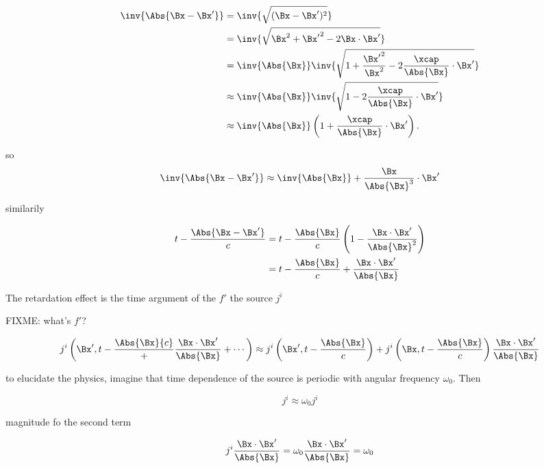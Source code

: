 \begin{align*}
\inv{\Abs{\Bx - \Bx'}}
&=
\inv{\sqrt{(\Bx - \Bx')^2}} \\
&=
\inv{\sqrt{\Bx^2 + {\Bx'}^2 - 2 \Bx \cdot \Bx'}} \\
&=
\inv{\Abs{\Bx}} \inv{\sqrt{1 + \frac{{\Bx'}^2}{\Bx^2} - 2 \frac{\xcap}{\Abs{\Bx}} \cdot \Bx'}} \\
&\approx
\inv{\Abs{\Bx}} \inv{\sqrt{1 - 2 \frac{\xcap}{\Abs{\Bx}} \cdot \Bx'}} \\
&\approx
\inv{\Abs{\Bx}} \left(1 + \frac{\xcap}{\Abs{\Bx}} \cdot \Bx' \right).
\end{align*}

so
\begin{equation}\label{eqn:relativisticElectrodynamicsL20:30}
\inv{\Abs{\Bx - \Bx'}}
\approx 
\inv{\Abs{\Bx}} + \frac{\Bx}{\Abs{\Bx}^3} \cdot \Bx' 
\end{equation}

similarily 

\begin{align*}
t - \frac{\Abs{\Bx - \Bx'}}{c} 
&= t - \frac{\Abs{\Bx}}{c} \left( 1 - \frac{\Bx \cdot \Bx'}{\Abs{\Bx}^2} \right) \\
&= t - \frac{\Abs{\Bx}}{c} + \frac{\Bx \cdot \Bx'}{\Abs{\Bx}}
\end{align*}

The retardation effect is the time argument of the $f'$ the source $j^i$

FIXME: what's $f'$?

\begin{equation}\label{eqn:relativisticElectrodynamicsL20:50}
j^i\left(\Bx', t - \frac{\Abs{\Bx}{c}} + \frac{\Bx \cdot \Bx'}{\Abs{\Bx}} + \cdots \right)
\approx
j^i\left(\Bx', t - \frac{\Abs{\Bx}}{c}\right) + j^i \left(\Bx, t - \frac{\Abs{\Bx}}{c}\right) \frac{\Bx \cdot \Bx'}{\Abs{\Bx}}
\end{equation}

to elucidate the physics, imagine that time dependence of the source is periodic with angular frequency $\omega_0$.  Then

\begin{equation}\label{eqn:relativisticElectrodynamicsL20:70}
j^i \approx \omega_0 j^i
\end{equation}

magnitude fo the second term 

\begin{equation}\label{eqn:relativisticElectrodynamicsL20:90}
j^i \frac{\Bx \cdot \Bx'}{\Abs{\Bx}} = \omega_0 \frac{\Bx \cdot \Bx'}{\Abs{\Bx}} = \omega_0 
\end{equation}

